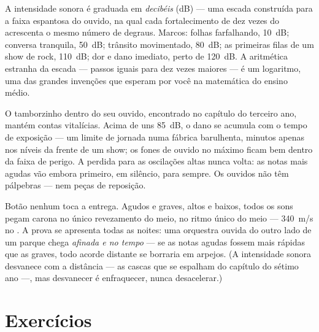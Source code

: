 \begin{example}\label{ex:g8:sound-pitch-loudness:decibels}
A intensidade sonora é graduada em \emph{decibéis}
(\unit{dB}) --- uma escada construída para a faixa espantosa do
ouvido, na qual cada fortalecimento de dez vezes do  acrescenta o
mesmo número de degraus. Marcos: folhas farfalhando, \qty{10}{dB};
conversa tranquila, \qty{50}{dB}; trânsito movimentado, \qty{80}{dB};
as primeiras filas de um show de rock, \qty{110}{dB}; dor e dano
imediato, perto de \qty{120}{dB}. A aritmética estranha da escada ---
passos iguais para  dez vezes maiores --- é um logaritmo, uma
das grandes invenções que esperam por você na matemática do ensino
médio.
\end{example}

\begin{remark}\label{rem:g8:sound-pitch-loudness:earsafety}
O tamborzinho dentro do seu ouvido, encontrado no capítulo do
terceiro ano, mantém contas vitalícias. Acima de uns \qty{85}{dB}, o
dano se acumula com o tempo de exposição --- um limite de jornada
numa fábrica barulhenta, minutos apenas nos níveis da frente de um
show; os fones de ouvido no  máximo ficam bem dentro da faixa
de perigo. A  perdida para as oscilações altas nunca volta: as
notas mais agudas vão embora primeiro, em silêncio, para sempre. Os
ouvidos não têm pálpebras --- nem peças de reposição.
\end{remark}

\begin{example}\label{ex:g8:sound-pitch-loudness:speed}
Botão nenhum toca a entrega. Agudos e graves, altos e baixos, todos
os sons pegam carona no único revezamento do meio, no ritmo único do
meio --- \qty{340}{m/s} no . A prova se apresenta todas as noites:
uma orquestra ouvida do outro lado de um parque chega \emph{afinada e
no tempo} --- se as notas agudas fossem mais rápidas que as graves,
todo acorde distante se borraria em arpejos. (A intensidade sonora
desvanece com a distância --- as cascas que se espalham do capítulo do
sétimo ano ---, mas desvanecer é enfraquecer, nunca desacelerar.)
\end{example}

\section{Exercícios}

